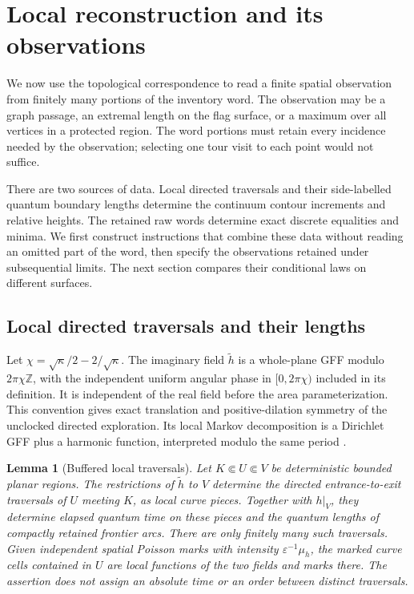 \documentclass[11pt]{article}
\numberwithin{equation}{section}
\newtheorem{lemma}[theorem]{Lemma}
\theoremstyle{definition}
\theoremstyle{remark}
\newcommand{\Z}{\mathbb Z}
\newcommand{\1}{\mathbf 1}
\begin{document}
\section{Local reconstruction and its observations}\label{local:section}

We now use the topological correspondence to read a finite spatial
observation from finitely many portions of the inventory word.  The
observation may be a graph passage, an extremal length on the flag
surface, or a maximum over all vertices in a protected region.  The
word portions must retain every incidence needed by the observation;
selecting one tour visit to each point would not suffice.

There are two sources of data.  Local directed traversals and their
side-labelled quantum boundary lengths determine the continuum contour
increments and relative heights.  The retained raw words determine
exact discrete equalities and minima.  We first construct instructions
that combine these data without reading an omitted part of the word,
then specify the observations retained under subsequential limits.
The next section compares their conditional laws on different surfaces.

\subsection{Local directed traversals and their lengths}

Let $\chi=\sqrt\kappa/2-2/\sqrt\kappa$.
The imaginary field $\widetilde h$ is a whole-plane GFF modulo
$2\pi\chi\Z$, with the independent uniform angular phase in
$[0,2\pi\chi)$ included in its definition.  It is independent of the real
field before the area parameterization.  This convention gives exact
translation and positive-dilation symmetry of the unclocked directed
exploration.  Its local Markov decomposition is a Dirichlet GFF plus a
harmonic function, interpreted modulo the same period
\cite[Section 2.2.1 and Propositions 2.8, 2.11]{MillerSheffieldIGIV}.

\begin{lemma}[Buffered local traversals]\label{enc:local-exploration}
Let $K\Subset U\Subset V$ be deterministic bounded planar regions.
The restrictions of $\widetilde h$ to $V$ determine the directed
entrance-to-exit traversals of $U$ meeting $K$, as local curve pieces.
Together with $h|_V$, they determine elapsed quantum time on these
pieces and the quantum lengths of compactly retained frontier arcs.
There are only finitely many such traversals.  Given independent spatial
Poisson marks with intensity $\varepsilon^{-1}\mu_h$, the marked curve
cells contained in $U$ are local functions of the two fields and marks
there.  The assertion does not assign an absolute time or an order between
distinct traversals.
\end{lemma}
\end{document}

